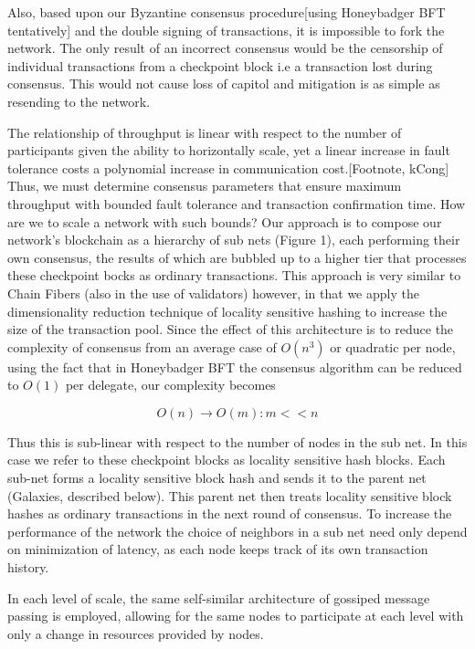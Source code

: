 \documentclass{article}
\begin{document}
Also, based upon our Byzantine consensus procedure[using Honeybadger BFT tentatively] and the double signing of transactions, it is impossible to fork the network. The only result of an incorrect consensus would be the censorship of individual transactions from a checkpoint block i.e a transaction lost during consensus. This would not cause loss of capitol and mitigation is as simple as resending to the network.

The relationship of throughput is linear with respect to the number of participants given the ability to horizontally scale, yet a linear increase in fault tolerance costs a polynomial increase in communication cost.[Footnote, kCong] Thus, we must determine consensus parameters that ensure maximum throughput with bounded fault tolerance and transaction confirmation time. How are we to scale a network with such bounds? Our approach is to compose our network's blockchain as a hierarchy of sub nets (Figure 1), each performing their own consensus, the results of which are bubbled up to a higher tier that processes these checkpoint bocks as ordinary transactions. This approach is very similar to Chain Fibers (also in the use of validators) however, in that we apply the dimensionality reduction technique of locality sensitive hashing to increase the size of the transaction pool. Since the effect of this architecture is to reduce the complexity of consensus from an average case  of $O(n^3)$ or quadratic per node, using the fact that in Honeybadger BFT the consensus algorithm can be reduced to $O(1)$ per delegate, our complexity becomes

\begin{equation}
O(n) \rightarrow O(m) : m<<n
\end{equation}

Thus this is sub-linear with respect to the number of nodes in the sub net. 
In this case we refer to these checkpoint blocks as locality sensitive hash blocks. Each sub-net forms a locality sensitive block hash and sends it to the parent net (Galaxies, described below). This parent net then treats locality sensitive block hashes as ordinary transactions in the next round of consensus. To increase the performance of the network the choice of neighbors in a sub net need only depend on minimization of latency, as each node keeps track of its own transaction history.

In each level of scale, the same self-similar architecture of gossiped message passing is employed, allowing for the same nodes to participate at each level with only a change in resources provided by nodes.
\end{document}

